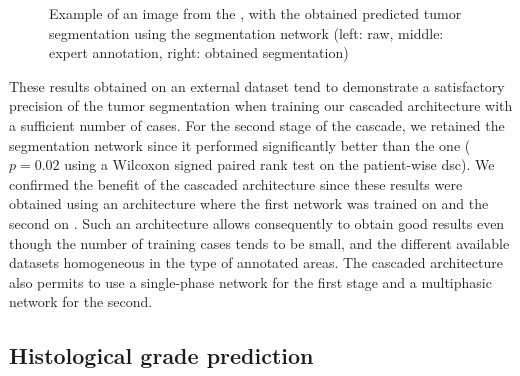 \begin{figure}[ht!]
\begin{minipage}{0.3\linewidth}
	\end{minipage}
	\caption{Example of an image from the \textbf{}, with the obtained predicted tumor segmentation using the  segmentation network (left: raw, middle: expert annotation, right: obtained segmentation)}
	\label{fig:TCIAMultiphaseTumorPred}
\end{figure}

These results obtained on an external dataset tend to demonstrate a satisfactory precision
of the tumor segmentation when training our cascaded architecture with a
sufficient number of cases.
For the second stage of the cascade, we retained the  segmentation network since it performed
significantly better than the  one ($ p = 0.02 $ using a Wilcoxon signed
paired rank test on the patient-wise \ac{dsc}).
We confirmed the benefit of the cascaded architecture since these results
were obtained using an architecture where the first network was trained
on \textbf{} and the second on \textbf{}. Such an architecture allows consequently to obtain good results even though the number of training cases tends to be small, and the different available datasets homogeneous in the type of annotated areas. The cascaded architecture also permits to use a single-phase network for the first stage and a multiphasic network for the second.

\subsection{Histological grade prediction}

